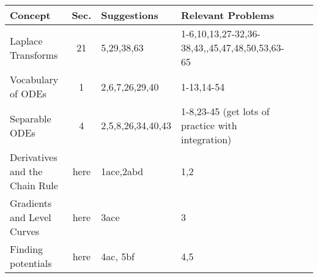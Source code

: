 \begin{center}
\begin{tabular}{|l|c|l|l|l|l|}
\hline
Concept&Sec.&Suggestions&Relevant Problems\\ \hline
Laplace Transforms&21&5,29,38,63&1-6,10,13,27-32,36-38,43,,45,47,48,50,53,63-65\\ \hline
Vocabulary of ODEs&1&2,6,7,26,29,40&1-13,14-54\\ \hline
Separable ODEs&4&2,5,8,26,34,40,43&1-8,23-45 (get lots of practice with integration)\\ \hline
Derivatives and the Chain Rule&here&1ace,2abd&1,2\\ \hline
Gradients and Level Curves&here&3ace&3\\ \hline
Finding potentials&here&4ac, 5bf&4,5\\ \hline
\end{tabular}
\end{center}
















